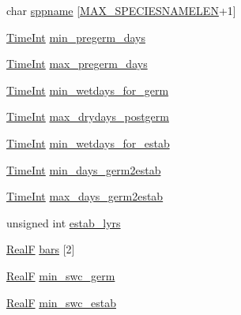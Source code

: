 \begin{DoxyCompactItemize}
\item 
char \hyperlink{struct_s_w___v_e_g_e_s_t_a_b___i_n_f_o_a7585284c370699db1e0d6902e0586fe3}{sppname} \mbox{[}\hyperlink{_s_w___defines_8h_a611f69bdc2c773cecd7c9b90f7a8b7bd}{M\+A\+X\+\_\+\+S\+P\+E\+C\+I\+E\+S\+N\+A\+M\+E\+L\+EN}+1\mbox{]}
\item 
\hyperlink{_times_8h_a25ac787161a5cad0e3fdfe5a5aeb3236}{Time\+Int} \hyperlink{struct_s_w___v_e_g_e_s_t_a_b___i_n_f_o_aca1a5d4d1645e520a53e93286241d66c}{min\+\_\+pregerm\+\_\+days}
\item 
\hyperlink{_times_8h_a25ac787161a5cad0e3fdfe5a5aeb3236}{Time\+Int} \hyperlink{struct_s_w___v_e_g_e_s_t_a_b___i_n_f_o_a405bfa3f4f32f4ce8c1d8a5eb768b655}{max\+\_\+pregerm\+\_\+days}
\item 
\hyperlink{_times_8h_a25ac787161a5cad0e3fdfe5a5aeb3236}{Time\+Int} \hyperlink{struct_s_w___v_e_g_e_s_t_a_b___i_n_f_o_abc919f26d643b86a7f5a08478fee792f}{min\+\_\+wetdays\+\_\+for\+\_\+germ}
\item 
\hyperlink{_times_8h_a25ac787161a5cad0e3fdfe5a5aeb3236}{Time\+Int} \hyperlink{struct_s_w___v_e_g_e_s_t_a_b___i_n_f_o_afc8df2155f6b9b9e9bdc2da790b00ee2}{max\+\_\+drydays\+\_\+postgerm}
\item 
\hyperlink{_times_8h_a25ac787161a5cad0e3fdfe5a5aeb3236}{Time\+Int} \hyperlink{struct_s_w___v_e_g_e_s_t_a_b___i_n_f_o_a4a7b511e4277f8e3e4d7ffa5d2ef1c69}{min\+\_\+wetdays\+\_\+for\+\_\+estab}
\item 
\hyperlink{_times_8h_a25ac787161a5cad0e3fdfe5a5aeb3236}{Time\+Int} \hyperlink{struct_s_w___v_e_g_e_s_t_a_b___i_n_f_o_a0d38bd0068b81d3538f8e1532bafdd6f}{min\+\_\+days\+\_\+germ2estab}
\item 
\hyperlink{_times_8h_a25ac787161a5cad0e3fdfe5a5aeb3236}{Time\+Int} \hyperlink{struct_s_w___v_e_g_e_s_t_a_b___i_n_f_o_ab498ec318e597cdeb00c4e3831b3ac62}{max\+\_\+days\+\_\+germ2estab}
\item 
unsigned int \hyperlink{struct_s_w___v_e_g_e_s_t_a_b___i_n_f_o_ac3e3025d1ce22c3e79713b3b930d0d52}{estab\+\_\+lyrs}
\item 
\hyperlink{generic_8h_a94d667c93da0511f21142d988f67674f}{RealF} \hyperlink{struct_s_w___v_e_g_e_s_t_a_b___i_n_f_o_a912efd96100f0924d71682579e2087eb}{bars} \mbox{[}2\mbox{]}
\item 
\hyperlink{generic_8h_a94d667c93da0511f21142d988f67674f}{RealF} \hyperlink{struct_s_w___v_e_g_e_s_t_a_b___i_n_f_o_a668ef47eb53852897a816c87da53f88d}{min\+\_\+swc\+\_\+germ}
\item 
\hyperlink{generic_8h_a94d667c93da0511f21142d988f67674f}{RealF} \hyperlink{struct_s_w___v_e_g_e_s_t_a_b___i_n_f_o_a28f5b722202e6c25714e63868472a116}{min\+\_\+swc\+\_\+estab}

\end{DoxyCompactItemize}
